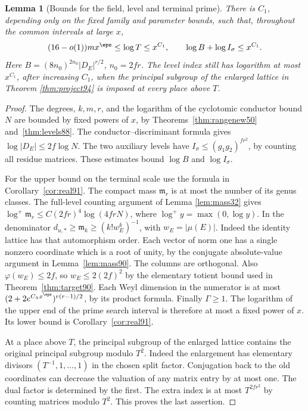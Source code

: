\documentclass[a4paper,11pt]{article}
\newtheorem{lemma}[proposition]{Lemma}
\theoremstyle{definition}
\theoremstyle{remark}
\numberwithin{equation}{section}
\begin{document}
\begin{lemma}[Bounds for the field, level and terminal prime]\label{lem:size97}
There is \(C_1\), depending only on the fixed family and parameter
bounds, such that, throughout the common intervals at large \(x\),
\[
 (16-o(1))m x^\eps\le\log T\le x^{C_1},\qquad
 \log B+\log I_\sigma\le x^{C_1}.
\]
Here \(B=(8n_0)^{2n_0}|D_E|^{r/2}\), \(n_0=2fr\). The level
index still has logarithm at most \(x^{C_1}\), after increasing
\(C_1\), when the principal subgroup of the enlarged lattice in
Theorem \ref{thm:project94} is imposed at every place above \(T\).
\end{lemma}
\begin{proof}
The degrees, \(k,m,r\), and the logarithm of the cyclotomic
conductor bound \(N\) are bounded by fixed powers of \(x\), by
Theorems~\ref{thm:rangenew50} and~\ref{thm:levels88}. The
conductor--discriminant formula gives \(\log|D_E|\le 2f\log N\).
The two auxiliary levels have \(I_\sigma\le(g_1g_2)^{fr^2}\),
by counting all residue matrices. These estimates bound \(\log B\)
and \(\log I_\sigma\).

For the upper bound on the terminal scale use the formula in
Corollary~\ref{cor:real91}. The compact mass \(\mathfrak m_r\)
is at most the number of its genus classes. The full-level
counting argument of
Lemma \ref{lem:mass32}
gives \(\log^+\mathfrak m_r\le C(2fr)^4\log(4frN)\), where
\(\log^+y=\max(0,\log y)\). In the denominator
\(d_{u,*}\ge\mathfrak m_k\ge(k!w_E^k)^{-1}\), with
\(w_E=|\mu(E)|\). Indeed the identity lattice has that automorphism
order. Each vector of norm one has a single nonzero coordinate
which is a root of unity, by the conjugate absolute-value argument
in Lemma~\ref{lem:mass90}. The columns are orthogonal. Also
\(\varphi(w_E)\le2f\), so \(w_E\le 2(2f)^2\) by the elementary
totient bound used in Theorem~\ref{thm:target90}. Each Weyl
dimension in the numerator is at most
\((2+2e^{C_\lambda x^\eps})^{r(r-1)/2}\), by its product formula.
Finally \(\Gamma\ge1\). The logarithm of the upper end of the
prime search interval is therefore at most a fixed power of \(x\).
Its lower bound is Corollary~\ref{cor:real91}.

At a place above \(T\), the principal subgroup of the enlarged
lattice contains the original principal subgroup modulo \(T^2\).
Indeed the enlargement has elementary divisors
\((T^{-1},1,\ldots,1)\) in the chosen split factor. Conjugation
back to the old coordinates can decrease the valuation of any
matrix entry by at most one. The dual factor is determined by
the first. The extra index is at most \(T^{2fr^2}\) by counting
matrices modulo \(T^2\). This proves the last assertion.
\end{proof}
\end{document}
